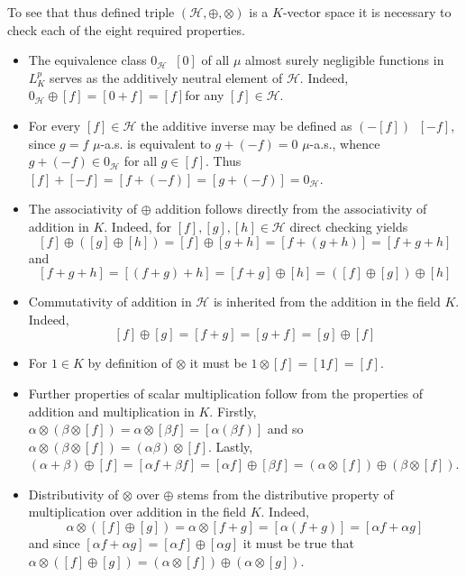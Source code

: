 \documentclass[a4paper]{article}
\newcommand{\clo}[1]{\left [ #1 \right ]}
\newcommand{\brac}[1]{\left ( #1 \right )}
\newcommand{\Hcal}{\mathcal{H}}
\newcommand{\defn}{\mathop{\overset{\Delta}{=}}\nolimits}
\begin{document}
To see that thus defined triple $\brac{\Hcal, \oplus, \otimes}$ is a $K$-vector space it is necessary to check each of the eight required properties.\begin{itemize}
	\item The equivalence class $0_\Hcal\defn\clo{0}$ of all $\mu$ almost surely negligible functions in $L^p_K$ serves as the additively neutral element of $\Hcal$. Indeed, $0_\Hcal\oplus \clo{f} = \clo{0+f} = \clo{f}$for any $\clo{f}\in\Hcal$.
	\item For every $\clo{f}\in \Hcal$ the additive inverse may be defined as $\brac{-\clo{f}}\defn\clo{-f}$, since $g=f$ $\mu$-a.s. is equivalent to $g+\brac{-f}=0$ $\mu$-a.s., whence $g+\brac{-f}\in 0_\Hcal$ for all $g\in \clo{f}$. Thus $\clo{f}+\clo{-f}=\clo{f+\brac{-f}}=\clo{g+\brac{-f}} = 0_\Hcal$.
	\item The associativity of $\oplus$ addition follows directly from the associativity of addition in $K$. Indeed, for $\clo{f}, \clo{g}, \clo{h}\in \Hcal$ direct checking yields \[\clo{f}\oplus\brac{\clo{g}\oplus\clo{h}} = \clo{f}\oplus\clo{g+h} = \clo{f+\brac{g+h}} = \clo{f+g+h}\] and \[\clo{f+g+h} = \clo{\brac{f+g}+h} = \clo{f+g}\oplus\clo{h} = \brac{\clo{f}\oplus\clo{g}}\oplus\clo{h}\]
	\item Commutativity of addition in $\Hcal$ is inherited from the addition in the field $K$. Indeed, \[\clo{f}\oplus\clo{g} = \clo{f+g} = \clo{g+f}=\clo{g}\oplus\clo{f}\]
	\item For $1\in K$ by definition of $\otimes$ it must be $1\otimes\clo{f} = \clo{1 f} = \clo{f}$.
	\item Further properties of scalar multiplication follow from the properties of addition and multiplication in $K$. Firstly, $\alpha\otimes\brac{\beta\otimes\clo{f}} = \alpha\otimes\clo{\beta f} = \clo{\alpha\brac{\beta f}}$ and so $\alpha\otimes\brac{\beta\otimes\clo{f}} = \brac{\alpha \beta}\otimes\clo{f}$. Lastly, $\brac{\alpha + \beta}\oplus\clo{f} = \clo{\alpha f + \beta f} = \clo{\alpha f}\oplus \clo{\beta f} = \brac{\alpha\otimes\clo{f}}\oplus \brac{\beta\otimes\clo{f}}$.
	\item Distributivity of $\otimes$ over $\oplus$ stems from the distributive property of multiplication over addition in the field $K$. Indeed, \[\alpha \otimes \brac{\clo{f}\oplus\clo{g}} = \alpha \otimes \clo{f+g} = \clo{\alpha\brac{f+g}} = \clo{\alpha f + \alpha g}\] and since $\clo{\alpha f + \alpha g} = \clo{\alpha f}\oplus \clo{\alpha g}$ it must be true that $\alpha \otimes \brac{\clo{f}\oplus\clo{g}} = \brac{\alpha\otimes\clo{f}}\oplus \brac{\alpha\otimes\clo{g}}$.
\end{itemize}
\end{document}
